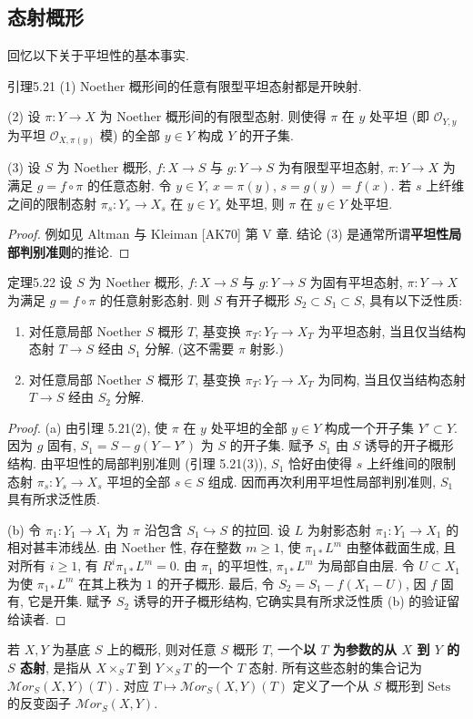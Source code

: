 \subsection{态射概形}\label{ch05:sec5.6.2}
回忆以下关于平坦性的基本事实.
\begin{origstatement}{引理}{5.21}\label{ch05:lem5.21}
(1) Noether 概形间的任意有限型平坦态射都是开映射.

(2) 设 $\pi:Y\to X$ 为 Noether 概形间的有限型态射. 则使得 $\pi$ 在 $y$ 处平坦 (即 $\mathcal O_{Y,y}$ 为平坦 $\mathcal O_{X,\pi(y)}$ 模) 的全部 $y\in Y$ 构成 $Y$ 的开子集.

(3) 设 $S$ 为 Noether 概形, $f:X\to S$ 与 $g:Y\to S$ 为有限型平坦态射, $\pi:Y\to X$ 为满足 $g=f\circ\pi$ 的任意态射. 令 $y\in Y$, $x=\pi(y)$, $s=g(y)=f(x)$. 若 $s$ 上纤维之间的限制态射 $\pi_s:Y_s\to X_s$ 在 $y\in Y_s$ 处平坦, 则 $\pi$ 在 $y\in Y$ 处平坦.
\end{origstatement}
\begin{proof}
例如见 Altman 与 Kleiman [AK70] 第 V 章. 结论 (3) 是通常所谓\textbf{平坦性局部判别准则}的推论.
\end{proof}

\begin{origstatement}{定理}{5.22}\label{ch05:thm5.22}
设 $S$ 为 Noether 概形, $f:X\to S$ 与 $g:Y\to S$ 为固有平坦态射, $\pi:Y\to X$ 为满足 $g=f\circ\pi$ 的任意射影态射. 则 $S$ 有开子概形 $S_2\subset S_1\subset S$, 具有以下泛性质:
\begin{enumerate}
\item[(a)] 对任意局部 Noether $S$ 概形 $T$, 基变换 $\pi_T:Y_T\to X_T$ 为平坦态射, 当且仅当结构态射 $T\to S$ 经由 $S_1$ 分解. (这不需要 $\pi$ 射影.)
\item[(b)] 对任意局部 Noether $S$ 概形 $T$, 基变换 $\pi_T:Y_T\to X_T$ 为同构, 当且仅当结构态射 $T\to S$ 经由 $S_2$ 分解.
\end{enumerate}
\end{origstatement}
\begin{proof}
(a) 由引理 5.21(2), 使 $\pi$ 在 $y$ 处平坦的全部 $y\in Y$ 构成一个开子集 $Y'\subset Y$. 因为 $g$ 固有, $S_1=S-g(Y-Y')$ 为 $S$ 的开子集. 赋予 $S_1$ 由 $S$ 诱导的开子概形结构. 由平坦性的局部判别准则 (引理 5.21(3)), $S_1$ 恰好由使得 $s$ 上纤维间的限制态射 $\pi_s:Y_s\to X_s$ 平坦的全部 $s\in S$ 组成. 因而再次利用平坦性局部判别准则, $S_1$ 具有所求泛性质.

(b) 令 $\pi_1:Y_1\to X_1$ 为 $\pi$ 沿包含 $S_1\hookrightarrow S$ 的拉回. 设 $L$ 为射影态射 $\pi_1:Y_1\to X_1$ 的相对甚丰沛线丛. 由 Noether 性, 存在整数 $m\geq1$, 使 $\pi_{1*}L^m$ 由整体截面生成, 且对所有 $i\geq1$, 有 $R^i\pi_{1*}L^m=0$. 由 $\pi_1$ 的平坦性, $\pi_{1*}L^m$ 为局部自由层. 令 $U\subset X_1$ 为使 $\pi_{1*}L^m$ 在其上秩为 $1$ 的开子概形. 最后, 令 $S_2=S_1-f(X_1-U)$, 因 $f$ 固有, 它是开集. 赋予 $S_2$ 诱导的开子概形结构, 它确实具有所求泛性质 (b) 的验证留给读者.
\end{proof}
若 $X,Y$ 为基底 $S$ 上的概形, 则对任意 $S$ 概形 $T$, 一个\textbf{以 $T$ 为参数的从 $X$ 到 $Y$ 的 $S$ 态射}, 是指从 $X\times_S T$ 到 $Y\times_S T$ 的一个 $T$ 态射. 所有这些态射的集合记为 $\mathcal{M}or_S(X,Y)(T)$. 对应 $T\mapsto\mathcal{M}or_S(X,Y)(T)$ 定义了一个从 $S$ 概形到 $\mathrm{Sets}$ 的反变函子 $\mathcal{M}or_S(X,Y)$.

